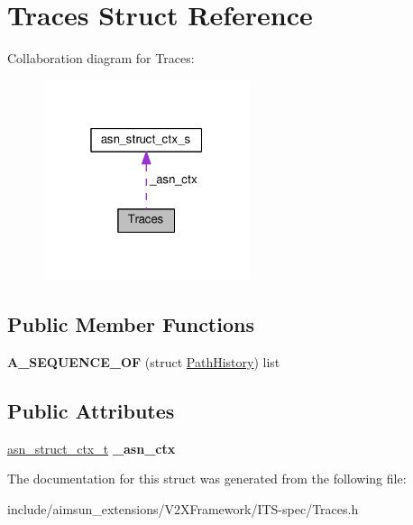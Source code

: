 \hypertarget{structTraces}{}\section{Traces Struct Reference}
\label{structTraces}


Collaboration diagram for Traces\+:\nopagebreak
\begin{figure}[H]
\begin{center}
\leavevmode
\includegraphics[width=172pt]{structTraces__coll__graph}
\end{center}
\end{figure}
\subsection*{Public Member Functions}
\begin{DoxyCompactItemize}
\item 
{\bfseries A\+\_\+\+S\+E\+Q\+U\+E\+N\+C\+E\+\_\+\+OF} (struct \hyperlink{structPathHistory}{Path\+History}) list\hypertarget{structTraces_abd906b801bccf2ac9ec1cdaf278f1584}{}\label{structTraces_abd906b801bccf2ac9ec1cdaf278f1584}

\end{DoxyCompactItemize}
\subsection*{Public Attributes}
\begin{DoxyCompactItemize}
\item 
\hyperlink{structasn__struct__ctx__s}{asn\+\_\+struct\+\_\+ctx\+\_\+t} {\bfseries \+\_\+asn\+\_\+ctx}\hypertarget{structTraces_aeaeead1eef845d5b25a7bf3de96ba939}{}\label{structTraces_aeaeead1eef845d5b25a7bf3de96ba939}

\end{DoxyCompactItemize}


The documentation for this struct was generated from the following file\+:\begin{DoxyCompactItemize}
\item 
include/aimsun\+\_\+extensions/\+V2\+X\+Framework/\+I\+T\+S-\/spec/Traces.\+h\end{DoxyCompactItemize}
